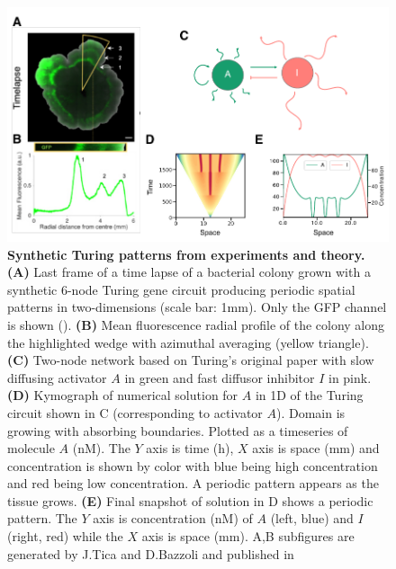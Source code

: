 \documentclass[10pt,letterpaper]{article}
\begin{document}
\begin{figure}[H]
    \includegraphics[width=1\textwidth]{figures/biological_example}

    \caption{{\bf Synthetic Turing patterns from experiments and theory.}
        \textbf{(A)} Last frame of a time lapse of a bacterial colony grown with a synthetic 6-node Turing gene circuit producing periodic spatial patterns in two-dimensions (scale bar: 1mm). Only the GFP channel is shown (\cite{Oliver2023}). \textbf{(B)} Mean fluorescence radial profile of the colony along the highlighted wedge with azimuthal averaging (yellow triangle). \textbf{(C)} Two-node network based on Turing’s original paper \cite{Turing1952} with slow diffusing activator $A$ in green and fast diffusor inhibitor $I$ in pink. \textbf{(D)} Kymograph of numerical solution for $A$ in 1D of the Turing circuit shown in C (corresponding to activator $A$). Domain is growing with absorbing boundaries. Plotted as a timeseries of molecule $A$ (nM). The $Y$ axis is time (h), $X$ axis is space (mm) and concentration is shown by color with blue being high concentration and red being low concentration. A periodic pattern appears as the tissue grows. \textbf{(E)} Final snapshot of solution in D shows a periodic pattern. The $Y$ axis is concentration (nM) of $A$ (left, blue) and $I$ (right, red) while the $X$ axis is space (mm). A,B subfigures are generated by J.Tica and D.Bazzoli and published in \cite{Oliver2023}}
    \label{fig1}
\end{figure}
\end{document}
